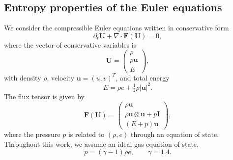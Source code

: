 \documentclass[fleqn,11pt]{amsart}
\begin{document}

\subsection{Entropy properties of the Euler equations}

We consider the compressible Euler equations written in conservative
form
\begin{equation}
\partial_t \bm U + \nabla\cdot\bm F(\bm U)=0,
\end{equation}
where the vector of conservative variables is
\begin{equation}
\bm U =
\begin{pmatrix}
\rho\\
\rho\bm u\\
E
\end{pmatrix},
\end{equation}
with density $\rho$, velocity $\bm u=(u,v)^T$, and total energy
\[
E=\rho e+\tfrac12\rho|\bm u|^2.
\]
The flux tensor is given by
\begin{equation}
\bm F(\bm U)=
\begin{pmatrix}
\rho\bm u\\
\rho\bm u\otimes\bm u+p\bm I\\
(E+p)\bm u
\end{pmatrix},
\end{equation}
where the pressure $p$ is related to $(\rho,e)$ through an equation of
state. Throughout this work, we assume an ideal gas equation of state,
\[
p=(\gamma-1)\rho e,\qquad \gamma=1.4.
\]
\end{document}
